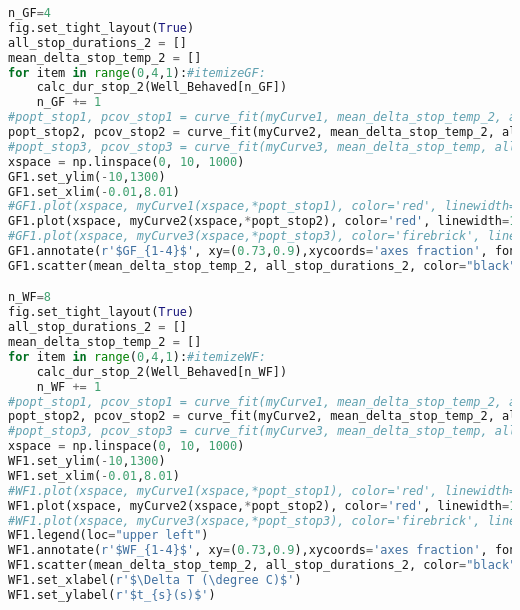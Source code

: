 \begin{lstlisting}[language=Python, basicstyle=\tiny, frame=single, keywordstyle=\color{teal}, commentstyle=\color{olive}, stringstyle=\color{red}]
n_GF=4
fig.set_tight_layout(True)
all_stop_durations_2 = []
mean_delta_stop_temp_2 = []
for item in range(0,4,1):#itemizeGF:
    calc_dur_stop_2(Well_Behaved[n_GF])
    n_GF += 1
#popt_stop1, pcov_stop1 = curve_fit(myCurve1, mean_delta_stop_temp_2, all_stop_durations_2, maxfev = 200000, p0=(0,0))
popt_stop2, pcov_stop2 = curve_fit(myCurve2, mean_delta_stop_temp_2, all_stop_durations_2, maxfev = 200000, p0=(0,0))
#popt_stop3, pcov_stop3 = curve_fit(myCurve3, mean_delta_stop_temp, all_stop_durations, maxfev = 200000, p0=(0,0,0))
xspace = np.linspace(0, 10, 1000)
GF1.set_ylim(-10,1300)
GF1.set_xlim(-0.01,8.01)
#GF1.plot(xspace, myCurve1(xspace,*popt_stop1), color='red', linewidth=1.1, linestyle='dashed', label=r'$\tau/(1+(\beta*\Delta T))$')
GF1.plot(xspace, myCurve2(xspace,*popt_stop2), color='red', linewidth=1.1, linestyle='dashdot', label=r'$\tau*\exp(-\beta*\Delta T)$')
#GF1.plot(xspace, myCurve3(xspace,*popt_stop3), color='firebrick', linewidth=1.1, label=r'$\tau*(\beta*\Delta T)**\gamma$')
GF1.annotate(r'$GF_{1-4}$', xy=(0.73,0.9),xycoords='axes fraction', fontsize=12)
GF1.scatter(mean_delta_stop_temp_2, all_stop_durations_2, color="black", alpha=0.3)

n_WF=8
fig.set_tight_layout(True)
all_stop_durations_2 = []
mean_delta_stop_temp_2 = []
for item in range(0,4,1):#itemizeWF:
    calc_dur_stop_2(Well_Behaved[n_WF])
    n_WF += 1
#popt_stop1, pcov_stop1 = curve_fit(myCurve1, mean_delta_stop_temp_2, all_stop_durations_2, maxfev = 200000, p0=(0,0))
popt_stop2, pcov_stop2 = curve_fit(myCurve2, mean_delta_stop_temp_2, all_stop_durations_2, maxfev = 200000, p0=(0,0))
#popt_stop3, pcov_stop3 = curve_fit(myCurve3, mean_delta_stop_temp, all_stop_durations, maxfev = 200000, p0=(0,0,0))
xspace = np.linspace(0, 10, 1000)
WF1.set_ylim(-10,1300)
WF1.set_xlim(-0.01,8.01)
#WF1.plot(xspace, myCurve1(xspace,*popt_stop1), color='red', linewidth=1.1, linestyle='dashed', label=r'$\tau/(1+(\beta*\Delta T))$')
WF1.plot(xspace, myCurve2(xspace,*popt_stop2), color='red', linewidth=1.1, linestyle='dashdot', label=r'$\tau*e^{-\beta*\Delta T}$')
#WF1.plot(xspace, myCurve3(xspace,*popt_stop3), color='firebrick', linewidth=1.1, label=r'$\tau*(\beta*\Delta T)**\gamma$')
WF1.legend(loc="upper left")
WF1.annotate(r'$WF_{1-4}$', xy=(0.73,0.9),xycoords='axes fraction', fontsize=12)
WF1.scatter(mean_delta_stop_temp_2, all_stop_durations_2, color="black", alpha=0.3)
WF1.set_xlabel(r'$\Delta T (\degree C)$')
WF1.set_ylabel(r'$t_{s}(s)$')


\end{lstlisting}
